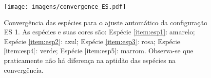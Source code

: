 %

\begin{figure}[!htb]
\centering
\texttt{[image: imagens/convergence\_ES.pdf]}
\caption[Convergência das espécies para o ajuste automático da
configuração ES 1.]{Convergência das espécies para o ajuste automático da
configuração ES 1. As espécies e suas cores são: Espécie \ref{item:esp1}:
amarelo; Espécie \ref{item:esp2}: azul; Espécie \ref{item:esp3}: rosa;
Espécie \ref{item:esp4}: verde; Espécie \ref{item:esp5}: marrom.
Observa-se que praticamente não há diferença na aptidão das espécies
na convergência.}
\label{fig:convergencia_es_1}
\end{figure}

